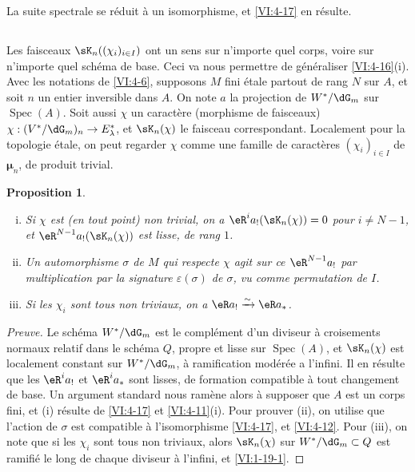 \documentclass[oneside]{book}
\DeclareMathOperator{\spec}{Spec}
\newcommand{\dmu}{{\bm\mu}}
\newcommand{\iso}{\xrightarrow\sim}
\theoremstyle{sga-source}
\theoremstyle{sga-source-dash}
\theoremstyle{sga-source-dotdash}
\theoremstyle{sga-source-number-note-dash}
\theoremstyle{sga-source-note-number-dotdash}
\theoremstyle{sga-source-example-dotdash}
\theoremstyle{sga-source-inline-number}
\theoremstyle{sga-source-bare-number}
\theoremstyle{sga-source}
\newtheorem{proposition_}[subsection]{Proposition}
\newcommand{\PrintPage}[1]{}\newcommand{\MathPage}[1]{}\newcommand{\PrintCite}[2]{#1}\newcommand{\var}[3]{#1}
\begin{document}
La suite spectrale se réduit à un isomorphisme, et \ref{VI:4-17} en 
résulte. 





\subsection{}\label{VI:4-19}

Les faisceaux $\sK_n((\chi_i)_{i\in I})$ ont un sens sur n'importe quel corps, 
voire sur n'importe quel schéma de base. Ceci va nous permettre de généraliser 
\ref{VI:4-16}(i). Avec les notations de \ref{VI:4-6}, supposons $M$ fini 
étale partout de rang $N$ sur $A$, et soit $n$ un entier inversible dans $A$. 
On note $a$ la projection de $W^\ast/\dG_m$ sur $\spec(A)$. Soit aussi $\chi$ 
un caractère (morphisme de faisceaux) 
$\chi:(V^\ast/\dG_m)_n \to E_\lambda^\ast$, et $\sK_n(\chi)$ le faisceau 
correspondant. Localement pour la topologie étale, on peut regarder $\chi$ 
comme une famille de caractères $(\chi_i)_{i\in I}$ de $\dmu_n$, de produit 
trivial. 





\begin{proposition_}\label{VI:4-20}
\begin{enumerate}[(i)]
  \item Si $\chi$ est (en tout point) non trivial, on a 
    $\eR^i a_! (\sK_n(\chi)) = 0$ pour $i\ne \var{N-1}{N-2}{S45-SOL-0856}$, et 
    $\eR^{\var{N-1}{N-2}{S45-SOL-0856}} a_!(\sK_n(\chi))$ est lisse, de rang $1$. 
  \item Un automorphisme $\sigma$ de $M$ qui respecte $\chi$ agit sur ce 
    $\eR^{\var{N-1}{N-2}{S45-SOL-0856}} a_!$ par multiplication par la signature $\varepsilon(\sigma)$ 
    de $\sigma$, vu comme permutation de $I$. 
  \item Si les $\chi_i$ sont tous non triviaux, on a $\eR a_! \iso \eR a_\ast$. 
\end{enumerate}
\end{proposition_}
\begin{proof}[Preuve]
Le schéma $W^\ast/\dG_m$ est le complément d'un diviseur à croisements 
normaux relatif dans le schéma $Q$, propre et lisse sur $\spec(A)$, et 
$\sK_n(\chi)$ est \PrintPage{207}
localement constant sur $W^\ast/\dG_m$, à ramification 
\var{modérée a l'infini}{modérée à l'infini}{S45-SOL-0858}. Il en résulte que les $\eR^i a_!$ et 
$\eR^i a_\ast$ sont lisses, de formation compatible à tout changement de 
base. Un argument standard nous ramène alors à supposer que $A$ est un 
corps fini, et (i) résulte de \ref{VI:4-17} et \ref{VI:4-11}(i). Pour 
prouver (ii), on utilise que l'action de $\sigma$ est compatible à 
l'isomorphisme \ref{VI:4-17}, et \ref{VI:4-12}. Pour (iii), on note que si les 
$\chi_i$ sont tous non triviaux, alors $\sK_n(\chi)$ sur 
$W^\ast/\dG_m\subset Q$ est ramifié le long de chaque diviseur à l'infini, 
et \ref{VI:1-19-1}. 
\end{proof}
\end{document}
